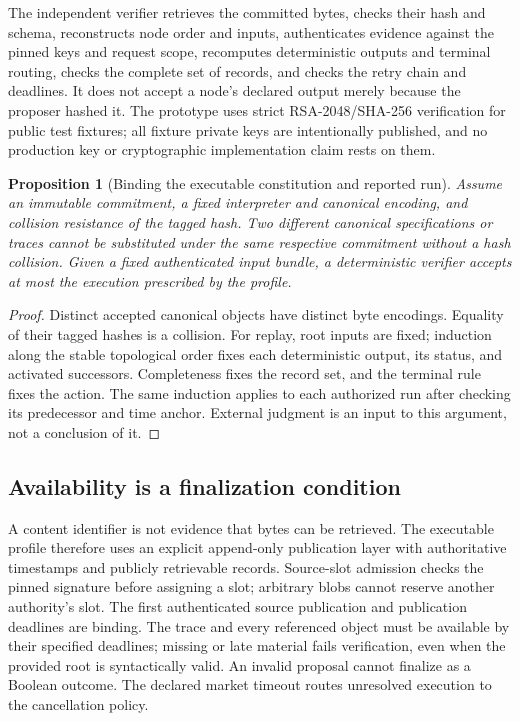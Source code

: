\documentclass[10pt]{article}
\newtheorem{proposition}{Proposition}
\begin{document}
The independent verifier retrieves the committed bytes, checks their hash and schema, reconstructs node order and inputs, authenticates evidence against the pinned keys and request scope, recomputes deterministic outputs and terminal routing, checks the complete set of records, and checks the retry chain and deadlines. It does not accept a node's declared output merely because the proposer hashed it. The prototype uses strict RSA-2048/SHA-256 verification for public test fixtures; all fixture private keys are intentionally published, and no production key or cryptographic implementation claim rests on them.

\begin{proposition}[Binding the executable constitution and reported run]
\label{prop:binding}
Assume an immutable commitment, a fixed interpreter and canonical encoding, and collision resistance of the tagged hash. Two different canonical specifications or traces cannot be substituted under the same respective commitment without a hash collision. Given a fixed authenticated input bundle, a deterministic verifier accepts at most the execution prescribed by the profile.
\end{proposition}
\begin{proof}
Distinct accepted canonical objects have distinct byte encodings. Equality of their tagged hashes is a collision. For replay, root inputs are fixed; induction along the stable topological order fixes each deterministic output, its status, and activated successors. Completeness fixes the record set, and the terminal rule fixes the action. The same induction applies to each authorized run after checking its predecessor and time anchor. External judgment is an input to this argument, not a conclusion of it.
\end{proof}

\subsection{Availability is a finalization condition}

A content identifier is not evidence that bytes can be retrieved. The executable profile therefore uses an explicit append-only publication layer with authoritative timestamps and publicly retrievable records. Source-slot admission checks the pinned signature before assigning a slot; arbitrary blobs cannot reserve another authority's slot. The first authenticated source publication and publication deadlines are binding. The trace and every referenced object must be available by their specified deadlines; missing or late material fails verification, even when the provided root is syntactically valid. An invalid proposal cannot finalize as a Boolean outcome. The declared market timeout routes unresolved execution to the cancellation policy.
\end{document}
